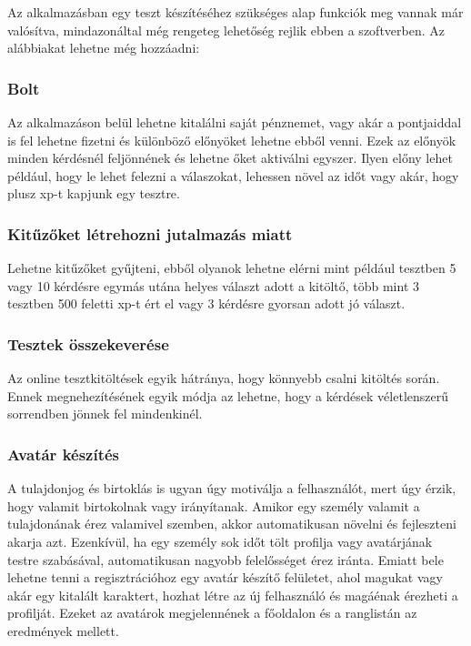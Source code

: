 
Az alkalmazásban egy teszt készítéséhez szükséges alap funkciók meg vannak már valósítva, mindazonáltal még rengeteg lehetőség rejlik ebben a szoftverben. Az alábbiakat lehetne még hozzáadni:

\subsubsection{Bolt}
Az alkalmazáson belül lehetne kitalálni saját pénznemet, vagy akár a pontjaiddal is fel lehetne fizetni és különböző előnyöket lehetne ebből venni. Ezek az előnyök minden kérdésnél feljönnének és lehetne őket aktiválni egyszer. Ilyen előny lehet például, hogy le lehet felezni a válaszokat, lehessen növel az időt vagy akár, hogy plusz xp-t kapjunk egy tesztre.

\subsubsection{Kitűzőket létrehozni jutalmazás miatt}
Lehetne kitűzőket gyűjteni, ebből olyanok lehetne elérni mint például tesztben 5 vagy 10 kérdésre egymás utána helyes választ adott a kitöltő, több mint 3 tesztben 500 feletti xp-t ért el vagy 3 kérdésre gyorsan adott jó választ.

\subsubsection{Tesztek összekeverése}
Az online tesztkitöltések egyik hátránya, hogy könnyebb csalni kitöltés során. Ennek megnehezítésének egyik módja az lehetne, hogy a kérdések véletlenszerű sorrendben jönnek fel mindenkinél.

\subsubsection{Avatár készítés}
A tulajdonjog és birtoklás is ugyan úgy motiválja a felhasználót, mert úgy érzik, hogy valamit birtokolnak vagy irányítanak. Amikor egy személy valamit a tulajdonának érez valamivel szemben, akkor automatikusan növelni és fejleszteni akarja azt. Ezenkívül, ha egy személy sok időt tölt profilja vagy avatárjának testre szabásával, automatikusan nagyobb felelősséget érez iránta. Emiatt bele lehetne tenni a regisztrációhoz egy avatár készítő felületet, ahol magukat vagy akár egy kitalált karaktert, hozhat létre az új felhasználó és magáénak érezheti a profilját. Ezeket az avatárok megjelennének a főoldalon és a ranglistán az eredmények mellett.

